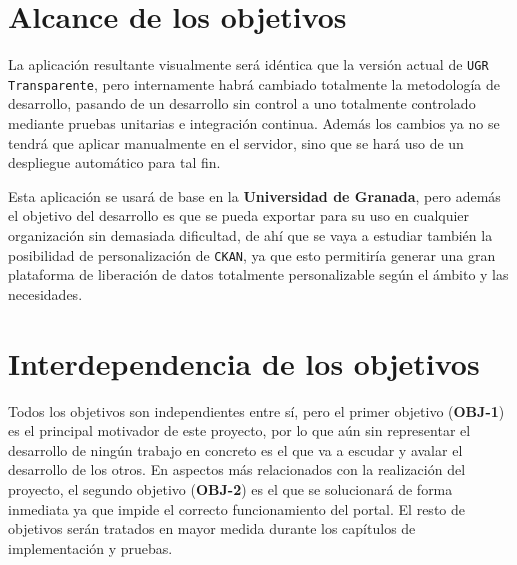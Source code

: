 \section{Alcance de los objetivos}

La aplicación resultante visualmente será idéntica que la versión actual de {\tt UGR Transparente}, pero internamente habrá cambiado totalmente la metodología de desarrollo, pasando de un desarrollo sin control a uno totalmente controlado mediante pruebas unitarias e integración continua. Además los cambios ya no se tendrá que aplicar manualmente en el servidor, sino que se hará uso de un despliegue automático para tal fin.

\bigskip
Esta aplicación se usará de base en la \textbf{Universidad de Granada}, pero además el objetivo del desarrollo es que se pueda exportar para su uso en cualquier organización sin demasiada dificultad, de ahí que se vaya a estudiar también la posibilidad de personalización de {\tt CKAN}, ya que esto permitiría generar una gran plataforma de liberación de datos totalmente personalizable según el ámbito y las necesidades.

\section{Interdependencia de los objetivos}

Todos los objetivos son independientes entre sí, pero el primer objetivo (\textbf{OBJ-1}) es el principal motivador de este proyecto, por lo que aún sin representar el desarrollo de ningún trabajo en concreto es el que va a escudar y avalar el desarrollo de los otros. En aspectos más relacionados con la realización del proyecto, el segundo objetivo (\textbf{OBJ-2}) es el que se solucionará de forma inmediata ya que impide el correcto funcionamiento del portal. El resto de objetivos serán tratados en mayor medida durante los capítulos de implementación y pruebas.